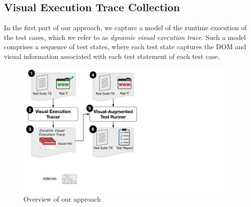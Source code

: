 \subsection{Visual Execution Trace Collection}
%
In the first part of our approach, we capture a model of the runtime execution of the test cases, which we refer to as \textit{dynamic visual execution trace}.
Such a model comprises a sequence of test states, where each test state captures the DOM and visual information associated with each test statement of each test case. 

\begin{figure}[t]
\centering
\includegraphics[trim={0.2cm 6.5cm 17cm 0.2cm},clip,scale=0.28]{images/approach-bigger}
\caption{Overview of our approach}
\label{approach}
\end{figure}




